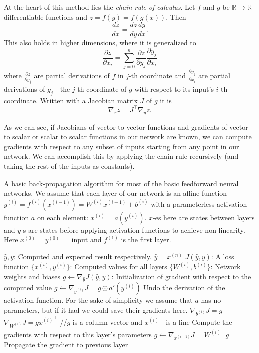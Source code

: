 At the heart of this method lies the \textit{chain rule of calculus}. Let $f$ and $g$ be $\mathbb{R}\rightarrow\mathbb{R}$ differentiable functions and $z=f(y)=f(g(x))$. Then $$\frac{dz}{d x}=\frac{d z}{d y}\frac{d y}{d x}.$$ This also holds in higher dimensions, where it is generalized to $$\frac{\partial z}{\partial x_i}=\sum_{j=0}^n\frac{\partial z}{\partial y_j}\frac{\partial y_j}{\partial x_i}$$ where $\frac{\partial z}{\partial y_j}$ are partial derivations of $f$ in $j$-th coordinate and $\frac{\partial y_j}{\partial x_i}$ are partial derivations of $g_j$ - the $j$-th coordinate of $g$ with respect to its input's $i$-th coordinate. Written with a Jacobian matrix $J$ of $g$ it is $$\nabla_x z = J^\top \nabla_y z.$$

As we can see, if Jacobians of vector to vector functions and gradients of vector to scalar or scalar to scalar functions in our network are known, we can compute gradients with respect to any subset of inputs starting from any point in our network. We can accomplish this by applying the chain rule recursively (and taking the rest of the inputs as constants).

\begin{algorithm}[h!]
\label{alg:backprop}
\caption{A basic back-propagation algorithm for most of the basic feedforward neural networks. We assume that each layer of our network is an affine function $y^{(i)}=f^{(i)}(x^{(i-1)})=W^{(i)}x^{(i-1)}+b^{(i)}$ with a parameterless activation function $a$ on each element: $x^{(i)}=a(y^{(i)})$. $x$-es here are states between layers and $y$-s are states before applying activation functions to achieve non-linearity. Here $x^{(0)}=y^{(0)}=$ input and $f^{(1)}$ is the first layer.}
\begin{algorithmic}
\REQUIRE $\widehat{y},y$: Computed and expected result respectively. $\widehat{y}=x^{(n)}$
\REQUIRE $J(\widehat{y},y)$: A loss function
\REQUIRE $\{x^{(i)},y^{(i)}\}$: Computed values for all layers 
\REQUIRE $\{W^{(i)},b^{(i)}\}$: Network weights and biases
\STATE $g\leftarrow \nabla_{\hat{y}}J(\widehat{y},y)$: Initialization of gradient with respect to the computed value
	\STATE $g\leftarrow \nabla_{y^{(i)}}J=g\odot a'(y^{(i)})$
	\STATE Undo the derivation of the activation function. For the sake of simplicity we assume that $a$ has no parameters, but if it had we could save their gradients here.
	\STATE 
	\STATE $\nabla_{b^{(i)}}J=g$
	\STATE $\nabla_{W^{(i)}}J=g{x^{(i)}}^\top$ //$g$ is a column vector and ${x^{(i)}}^\top$ is a line
	\STATE Compute the gradients with respect to this layer's parameters
	\STATE
	\STATE $g\leftarrow \nabla_{x^{(i-1)}}J={W^{(i)}}^\top g$
	\STATE Propagate the gradient to previous layer
\ENDFOR
\end{algorithmic}
\end{algorithm}

